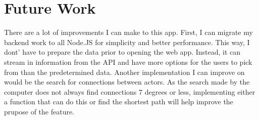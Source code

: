 \documentclass[a4paper,11pt]{article}
\begin{document}
\section*{Future Work}
There are a lot of improvements I can make to this app. First, I can migrate my backend work to all Node.JS for simplicity and better performance. This way, I dont' have to prepare the data prior to opening the web app. Instead, it can stream in information from the API and have more options for the users to pick from than the predetermined data. Another implementation I can improve on would be the search for connections between actors. As the search made by the computer does not always find connections 7 degrees or less, implementing either a function that can do this or find the shortest path will help improve the prupose of the feature.
\end{document}
